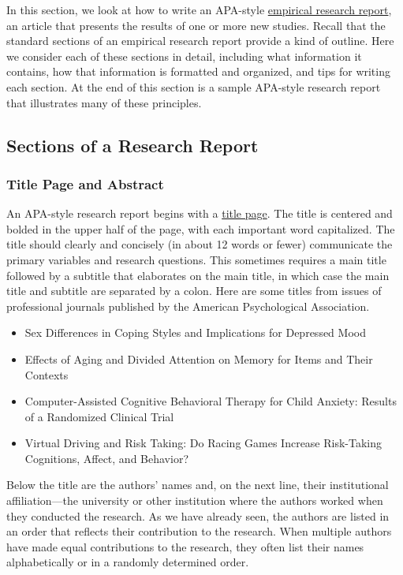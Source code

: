 \documentclass[
]{krantz}
\providecommand{\tightlist}{%
  \setlength{\itemsep}{0pt}\setlength{\parskip}{0pt}}
\begin{document}
In this section, we look at how to write an APA-style \protect\hyperlink{empirical-research-report-1}{empirical research report}, an article that presents the results of one or more new studies. Recall that the standard sections of an empirical research report provide a kind of outline. Here we consider each of these sections in detail, including what information it contains, how that information is formatted and organized, and tips for writing each section. At the end of this section is a sample APA-style research report that illustrates many of these principles.

\hypertarget{sections-of-a-research-report}{%
\subsection*{Sections of a Research Report}\label{sections-of-a-research-report}}


\hypertarget{title-page-and-abstract}{%
\subsubsection*{Title Page and Abstract}\label{title-page-and-abstract}}


An APA-style research report begins with a \protect\hyperlink{title-page}{title page}. The title is centered and bolded in the upper half of the page, with each important word capitalized. The title should clearly and concisely (in about 12 words or fewer) communicate the primary variables and research questions. This sometimes requires a main title followed by a subtitle that elaborates on the main title, in which case the main title and subtitle are separated by a colon. Here are some titles from issues of professional journals published by the American Psychological Association.

\begin{itemize}
\tightlist
\item
  Sex Differences in Coping Styles and Implications for Depressed Mood
\item
  Effects of Aging and Divided Attention on Memory for Items and Their Contexts
\item
  Computer-Assisted Cognitive Behavioral Therapy for Child Anxiety: Results of a Randomized Clinical Trial
\item
  Virtual Driving and Risk Taking: Do Racing Games Increase Risk-Taking Cognitions, Affect, and Behavior?
\end{itemize}

Below the title are the authors' names and, on the next line, their institutional affiliation---the university or other institution where the authors worked when they conducted the research. As we have already seen, the authors are listed in an order that reflects their contribution to the research. When multiple authors have made equal contributions to the research, they often list their names alphabetically or in a randomly determined order.
\end{document}
